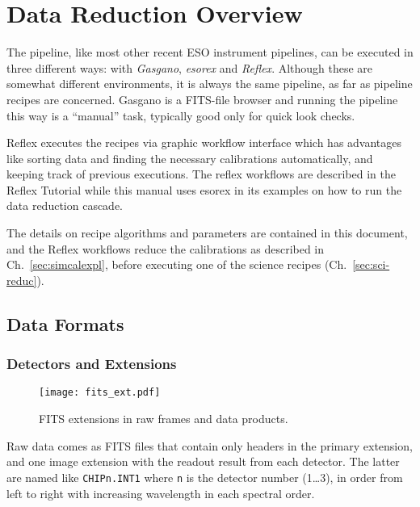 \section{Data Reduction Overview}
\label{sec:overview}

The \instrument{} pipeline, like most other recent ESO instrument pipelines, can be executed in three different ways: with \emph{Gasgano}, \emph{esorex} and \emph{Reflex}.
Although these are somewhat different environments, it is always the
same pipeline, as far as pipeline recipes are concerned.
Gasgano
is a FITS-file browser and running the pipeline this way is a ``manual'' task, typically good only for quick look checks.

Reflex executes the recipes via graphic workflow interface which has advantages like sorting data and finding the necessary calibrations
automatically, and keeping track of previous executions. 
The reflex workflows are described in the Reflex Tutorial while this manual uses esorex in its examples on how to run the data reduction cascade.

The details on recipe algorithms and parameters are contained in this document, and the Reflex workflows reduce the calibrations as described in Ch.~\ref*{sec:simcalexpl}, before executing one of the science recipes (Ch.~\ref*{sec:sci-reduc}).


\subsection{Data Formats}
\label{sec:data-fmt-quick}

\subsubsection{Detectors and Extensions}
\label{sec:extns}
\begin{figure}[!tb]
  \begin{center}
    \texttt{[image: fits\_ext.pdf]}
  \end{center}
  \caption{
    \label{fig:fits_ext}
    FITS extensions in raw frames and data products.
    }
\end{figure}

Raw data comes as FITS files that contain only headers in the primary extension,
and one image extension with the readout result from each detector. The latter
are named like \verb!CHIPn.INT1! where \texttt{n} is the detector number (1…3),
in order from left to right with increasing wavelength in each spectral order.

